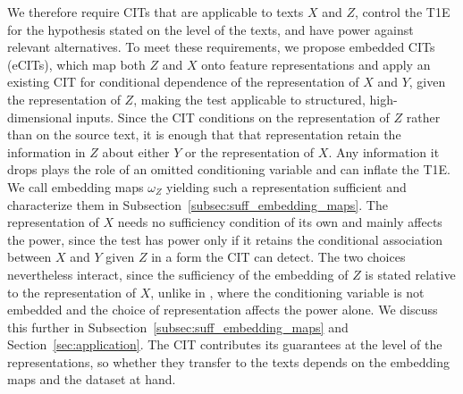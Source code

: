 \documentclass[twoside,11pt]{article}
\begin{document}
We therefore require CITs that are applicable to texts $X$ and $Z$, control the T1E for the hypothesis stated on the level of the texts, and have power against relevant alternatives.
To meet these requirements, we propose embedded CITs (eCITs), which map both $Z$ and $X$ onto feature representations and apply an existing CIT for conditional dependence of the representation of $X$ and $Y$, given the representation of $Z$, making the test applicable to structured, high-dimensional inputs.
Since the CIT conditions on the representation of $Z$ rather than on the source
text, it is enough that that representation retain the information in $Z$ about
either $Y$ or the representation of $X$. Any information it drops plays the role of an omitted conditioning variable and can inflate the T1E.
We call embedding maps $\omega_Z$ yielding such a representation sufficient and characterize them in Subsection~\ref{subsec:suff_embedding_maps}.
The representation of $X$ needs no sufficiency condition of its own and mainly affects the power, since the test has power only if it retains the conditional association between $X$ and $Y$ given $Z$ in a form the CIT can detect.
The two choices nevertheless interact, since the sufficiency of the embedding of $Z$ is stated relative to the representation of $X$, unlike in \citet{simnacher2026deep}, where the conditioning variable is not embedded and the choice of representation affects the power alone.
We discuss this further in Subsection~\ref{subsec:suff_embedding_maps} and Section~\ref{sec:application}.
The CIT contributes its guarantees at the level of the representations, so whether they transfer to the texts depends on the embedding maps and the dataset at hand.
\end{document}
